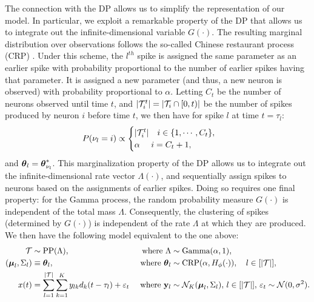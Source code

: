 The connection with the DP allows us to simplify the representation of our model. In particular, we exploit a remarkable property of the DP that
allows us to integrate out the infinite-dimensional variable $G(\cdot)$. The resulting marginal distribution over observations follows the so-called
 Chinese restaurant process (CRP) \citep{Pit2002a}. Under this scheme, the $l^{th}$ spike is assigned the same parameter as an earlier spike with probability 
proportional to the number of earlier spikes having that parameter. It is assigned a new parameter (and thus, a new neuron is observed) with probability 
proportional to $\alpha$. Letting $C_t$ be the number of neurons observed until time $t$, and  $|\mathcal{T}^t_i| = |\mathcal{T}_i \cap [0,t)|$ be the number of spikes produced by neuron $i$ before time $t$,
we then have for spike $l$ at time $t = \tau_l$: 
\vspace{-.06in}
\begin{align}
  P({\nu_l} = i) & \propto 
  \begin{cases}
   |\mathcal{T}^t_i| \quad i \in \{1,\cdots, C_{t}\}, \\
   \alpha \quad\ i = C_{t} + 1, 
  \end{cases}  
\label{eq:crp_marg_pr}
\end{align}
and $\boldsymbol{\theta}_l = \boldsymbol{\theta}^*_{\nu_l}$. 
This marginalization property of the DP allows us to integrate out the infinite-dimensional rate vector $\Lambda(\cdot)$, and sequentially 
assign spikes to neurons based on the assignments of earlier spikes.
Doing so requires one final property: for the Gamma process, the random probability measure $G(\cdot)$ is independent of the total mass $\Lambda$. 
Consequently, the clustering of spikes (determined by $G(\cdot)$) is independent of the rate $\Lambda$ at which they are produced. We then have
 the following model equivalent to the one above:
\begin{subequations}
\begin{align}
  \mathcal{T} &\sim \text{PP}(\Lambda), \qquad &\text{ where } \Lambda  &\sim \text{Gamma}(\alpha, 1),
   \\
   (\boldsymbol{\mu}_{l}, \Sigma_{l}) &\equiv \boldsymbol{\theta}_l,  &\text{ where } \boldsymbol{\theta}_l &\sim \text{CRP}(\alpha, H_{\phi}(\cdot)), \quad l \in [|\mathcal{T}|],   \label{eq:CRP}\\
  x(t) &=   \sum_{l=1}^{|\mathcal{T}|} \sum_{k=1}^K y_{lk} d_k(t - \tau_{l}) + \varepsilon_t  &\text{ where } \mathbf{y}_l &\sim \mathcal{N}_K(\boldsymbol{\mu}_{l}, \Sigma_{l}), \,  l \in [|\mathcal{T}|], \, \varepsilon_t \sim \mathcal{N}(0,\sigma^2).   \label{eq:CRP_mix}
\end{align}
\end{subequations}
